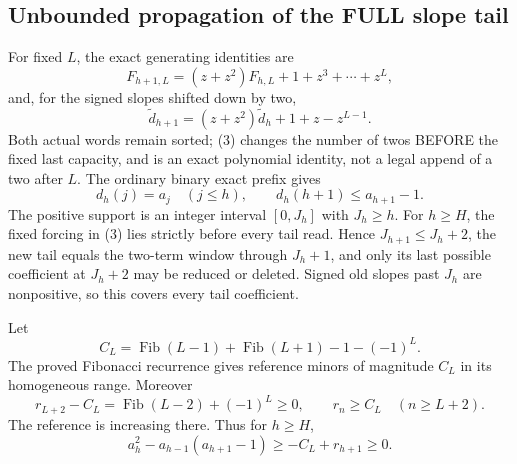 \subsection*{Unbounded propagation of the FULL slope tail}
For fixed $L$, the exact generating identities are
\[
 F_{h+1,L}=(z+z^2)F_{h,L}+1+z^3+\cdots+z^L,
\]
and, for the signed slopes shifted down by two,
\[
 \widetilde d_{h+1}
        =(z+z^2)\widetilde d_h+1+z-z^{L-1}.             \tag{3}
\]
Both actual words remain sorted; (3) changes the number of twos
BEFORE the fixed last capacity, and is an exact polynomial identity,
not a legal append of a two after $L$.
The ordinary binary exact prefix gives
\[
 d_h(j)=a_j\quad(j\le h),\qquad
                          d_h(h+1)\le a_{h+1}-1.         \tag{4}
\]
The positive support is an integer interval $[0,J_h]$ with $J_h\ge h$.
For $h\ge H$, the fixed forcing in (3) lies strictly before every
tail read.  Hence $J_{h+1}\le J_h+2$, the new tail equals the
two-term window through $J_h+1$, and only its last possible
coefficient at $J_h+2$ may be reduced or deleted.  Signed old slopes
past $J_h$ are nonpositive, so this covers every tail coefficient.

Let
\[
 C_L=\operatorname{Fib}(L-1)+\operatorname{Fib}(L+1)
                              -1-(-1)^L.
\]
The proved Fibonacci recurrence gives reference minors of magnitude
$C_L$ in its homogeneous range.  Moreover
\[
 r_{L+2}-C_L=\operatorname{Fib}(L-2)+(-1)^L\ge0,
                  \qquad r_n\ge C_L\quad(n\ge L+2).     \tag{5}
\]
The reference is increasing there.  Thus for $h\ge H$,
\[
       a_h^2-a_{h-1}(a_{h+1}-1)\ge-C_L+r_{h+1}\ge0.   \tag{6}
\]

